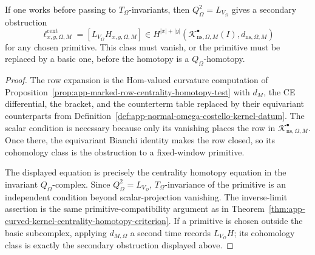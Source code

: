 \begin{prop}
  If one works before passing to \(T_\Omega\)-invariants, then
  \(Q_\Omega^2=L_{V_\Omega}\) gives a secondary obstruction
  \[
    \ell^{\mathrm{cent}}_{x,y,\Omega,M}
      =
    [L_{V_\Omega}H_{x,y,\Omega,M}]
      \in
    H^{|x|+|y|}
      (\mathcal K^\bullet_{\mathrm{ns},\Omega,M}(I),
       d_{\mathrm{ns},\Omega,M})
  \]
  for any chosen primitive.  This class must vanish, or the primitive
  must be replaced by a basic one, before the homotopy is a
  \(Q_\Omega\)-homotopy.
\end{prop}

\begin{proof}
  The row expansion is the Hom-valued curvature computation of
  Proposition~\ref{prop:app-marked-row-centrality-homotopy-test} with
  \(d_M\), the CE differential, the bracket, and the counterterm table
  replaced by their equivariant counterparts from
  Definition~\ref{def:app-normal-omega-costello-kernel-datum}.  The
  scalar condition is necessary because only its vanishing places the row in
  \(\mathcal K^\bullet_{\mathrm{ns},\Omega,M}\).  Once there, the
  equivariant Bianchi identity makes the row closed, so its cohomology
  class is the obstruction to a fixed-window primitive.

  The displayed equation is precisely the centrality homotopy equation in
  the invariant \(Q_\Omega\)-complex.  Since \(Q_\Omega^2=L_{V_\Omega}\),
  \(T_\Omega\)-invariance of the primitive is an independent condition
  beyond scalar-projection vanishing.  The inverse-limit
  assertion is the same primitive-compatibility argument as in
  Theorem~\ref{thm:app-curved-kernel-centrality-homotopy-criterion}.  If
  a primitive is chosen outside the basic subcomplex, applying
  \(d_{M,\Omega}\) a second time records \(L_{V_\Omega}H\); its
  cohomology class is exactly the secondary obstruction displayed above.
\end{proof}

